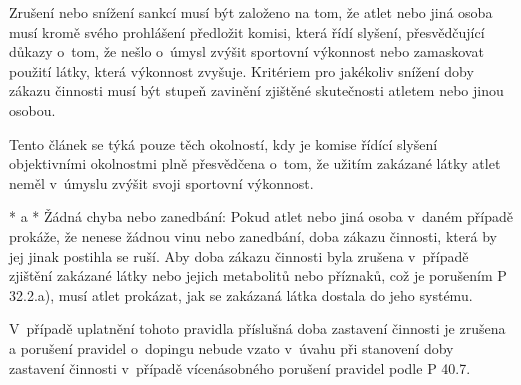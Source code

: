 Zrušení nebo snížení sankcí musí být založeno na tom, že atlet nebo jiná osoba musí kromě svého prohlášení předložit komisi, která řídí slyšení, přesvědčující důkazy o~tom, že nešlo o~úmysl zvýšit sportovní výkonnost nebo zamaskovat použití látky, která výkonnost zvyšuje. Kritériem pro jakékoliv snížení doby zákazu činnosti musí být stupeň zavinění zjištěné skutečnosti atletem nebo jinou osobou.

Tento článek se týká pouze těch okolností, kdy je komise řídící slyšení objektivními okolnostmi plně přesvědčena o~tom, že užitím zakázané látky atlet neměl v~úmyslu zvýšit svoji sportovní výkonnost.


* \begitems \style a
  * Žádná chyba nebo zanedbání: Pokud atlet nebo jiná osoba v~daném případě prokáže, že nenese žádnou vinu nebo zanedbání, doba zákazu činnosti, která by jej jinak postihla se ruší. Aby doba zákazu činnosti byla zrušena v~případě zjištění zakázané látky nebo jejich metabolitů  nebo příznaků, což je porušením P 32.2.a), musí atlet prokázat, jak se zakázaná látka dostala do jeho systému.

  V~případě uplatnění tohoto pravidla příslušná doba zastavení činnosti je zrušena a porušení pravidel o~dopingu nebude vzato v~úvahu při stanovení doby zastavení činnosti v~případě vícenásobného porušení pravidel podle P 40.7.

